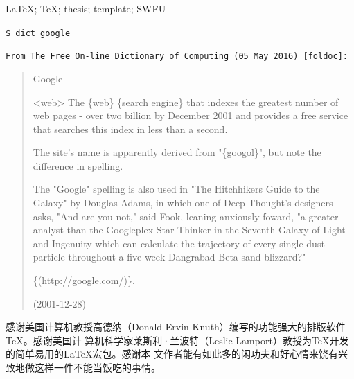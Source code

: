 \documentclass{swfuthesis}
\begin{document}
\begin{EKeyword} %
  \LaTeX{}; \TeX{}; thesis; template; SWFU
\end{EKeyword}

\tableofcontents %
\clearpage
\listoffigures %
\clearpage
\listoftables  %

\mainmatter






\appendix %

\makebib %

\begin{advisorInfo} %
\noindent{}\texttt{{\large \$ dict google}}
  \begin{singlespace}
    \noindent{}\texttt{From The Free On-line Dictionary of Computing (05 May 2016) [foldoc]:}

    \begin{quote}
      {\ttfamily \hspace{-2em}Google
    
        <web> The \{web\} \{search engine\} that indexes the greatest number of web pages
        - over two billion by December 2001 and provides a free service that searches this
        index in less than a second.
  
        The site's name is apparently derived from "\{googol\}", but note the difference
        in spelling.
  
        The "Google" spelling is also used in "The Hitchhikers Guide to the Galaxy" by
        Douglas Adams, in which one of Deep Thought's designers asks, "And are you not,"
        said Fook, leaning anxiously foward, "a greater analyst than the Googleplex Star
        Thinker in the Seventh Galaxy of Light and Ingenuity which can calculate the
        trajectory of every single dust particle throughout a five-week Dangrabad Beta
        sand blizzard?"
      
        \{(http://google.com/)\}.
      
        (2001-12-28) }
    \end{quote}
  \end{singlespace}
\end{advisorInfo}

\begin{acknowledgment} %
  感谢美国计算机教授高德纳（Donald Ervin Knuth）编写的功能强大的排版软件\TeX{}。感谢美国计
  算机科学家莱斯利·兰波特（Leslie Lamport）教授为\TeX{}开发的简单易用的\LaTeX{}宏包。感谢本
  文作者能有如此多的闲功夫和好心情来饶有兴致地做这样一件不能当饭吃的事情。
\end{acknowledgment}
\end{document}
